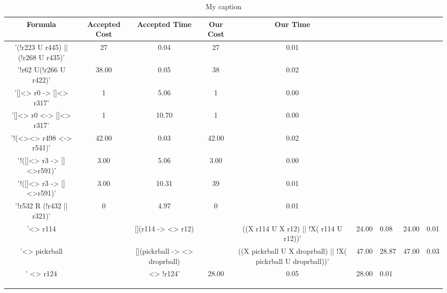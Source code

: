 \begin{table}[]
\centering
\caption{My caption}
\begin{tabular}{|c|c|c|c|c|}
\hline
Formula & Accepted Cost & Accepted Time & Our Cost & Our Time \\ \hline
     '(!r223 U r445) || (!r268 U r435)'  &         27      &      0.04         &      27   &     0.01     \\ \hline
      '!r62 U(!r266 U r422)'  &         38.00      &       0.05        &     38     &     0.02     \\ \hline
       '[]<> r0 -> []<> r317' &         1      &       5.06        &    1      &    0.00     \\ \hline
       '[]<> r0 <-> []<> r317'  & 1		&		10.70		& 1 	&  0.00 \\ \hline 
      '!(<><> r498 <-> r541)' &	42.00	&	0.03	&	42.00	&	0.02	\\		\hline
      '!([]<> r3 -> []<>r591)' &	 3.00	&	5.06 	&	3.00 	&	0.00	\\		\hline
      '!([]<> r3 -> []<>r591)' &	 3.00	&	10.31	&	39	&	0.01	\\		\hline
      '!r532 R (!r432 || r321)' &	 0	&	4.97 	&	0	&	0.01 	\\		\hline
      '<> r114 && [](r114 -> <> r12) && ((X r114 U X r12) || !X( r114 U r12))' &	24.00	&	0.08 	&	24.00	&	0.01	\\		\hline
    '<> pickrball && [](pickrball -> <> droprball) && ((X pickrball U X droprball) || !X( pickrball U droprball))'  &	47.00	&	28.87	&	47.00	&	0.03	\\		\hline
      ' <> r124 && <> !r124' &	28.00	&	0.05 	&	28.00	&	0.01	\\		\hline
      &		&		&		&		\\		\hline
      &		&		&		&		\\		\hline
      &		&		&		&		\\		\hline
\end{tabular}
\label{table}
\end{table}



